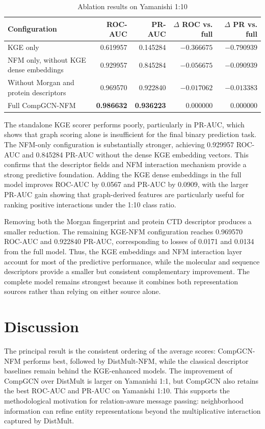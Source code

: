 \begin{table}[H]
\centering
\caption{Ablation results on Yamanishi 1:10}
\label{tab:ablation_study}
\small
\begin{tabularx}{\textwidth}{Xrrrr}
\toprule
\textbf{Configuration} & \textbf{ROC-AUC} & \textbf{PR-AUC} &
\textbf{$\Delta$ ROC vs. full} & \textbf{$\Delta$ PR vs. full} \\
\midrule
KGE only & 0.619957 & 0.145284 & $-0.366675$ & $-0.790939$ \\
NFM only, without KGE dense embeddings & 0.929957 & 0.845284 & $-0.056675$ & $-0.090939$ \\
Without Morgan and protein descriptors & 0.969570 & 0.922840 & $-0.017062$ & $-0.013383$ \\
Full CompGCN-NFM & \textbf{0.986632} & \textbf{0.936223} & 0.000000 & 0.000000 \\
\bottomrule
\end{tabularx}
\end{table}

The standalone KGE scorer performs poorly, particularly in PR-AUC, which shows
that graph scoring alone is insufficient for the final binary prediction task.
The NFM-only configuration is substantially stronger, achieving 0.929957
ROC-AUC and 0.845284 PR-AUC without the dense KGE embedding vectors. This
confirms that the descriptor fields and NFM interaction mechanism provide a
strong predictive foundation. Adding the KGE dense embeddings in the full model
improves ROC-AUC by 0.0567 and PR-AUC by 0.0909, with the larger PR-AUC gain
showing that graph-derived features are particularly useful for ranking positive
interactions under the 1:10 class ratio.

Removing both the Morgan fingerprint and protein CTD descriptor produces a
smaller reduction. The remaining KGE-NFM configuration reaches 0.969570
ROC-AUC and 0.922840 PR-AUC, corresponding to losses of 0.0171 and 0.0134 from
the full model. Thus, the KGE embeddings and NFM interaction layer account for
most of the predictive performance, while the molecular and sequence
descriptors provide a smaller but consistent complementary improvement. The
complete model remains strongest because it combines both representation
sources rather than relying on either source alone.

\section{Discussion}

The principal result is the consistent ordering of the average scores:
CompGCN-NFM performs best, followed by DistMult-NFM, while the classical
descriptor baselines remain behind the KGE-enhanced models. The improvement of
CompGCN over DistMult is larger on Yamanishi 1:1, but CompGCN also retains the
best ROC-AUC and PR-AUC on Yamanishi 1:10. This supports the methodological
motivation for relation-aware message passing: neighborhood information can
refine entity representations beyond the multiplicative interaction captured
by DistMult.


